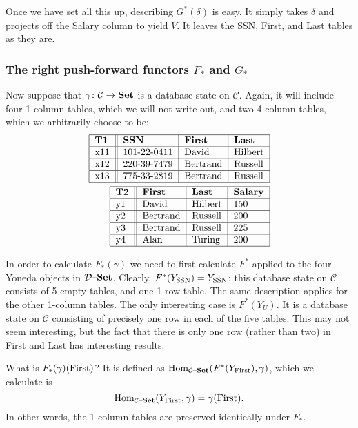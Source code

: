 \documentclass{amsart}
\def\tn{\textnormal}
\def\mc{\mathcal}
\def\Hom{\tn{Hom}}
\def\to{\rightarrow}
\def\taking{\colon}
\def\Sets{{\bf Set}}
\def\set{{\text \textendash}{\bf Set}}
\def\mcC{\mc{C}}
\def\mcD{\mc{D}}
\theoremstyle{remark}
\theoremstyle{definition}
\begin{document}
Once we have set all this up, describing $G^*(\delta)$ is easy.  It simply takes $\delta$ and projects off the Salary column to yield $V$.  It leaves the SSN, First, and Last tables as they are.

\subsubsection{The right push-forward functors $F_*$ and $G_*$}\label{sssec:rightpush}

Now suppose that $\gamma\taking\mcC\to\Sets$ is a database state on $\mcC$.  Again, it will include four 1-column tables, which we will not write out, and two 4-column tables, which we arbitrarily choose to be: \begin{align*}\begin{tabular}{| l || l | l | l |}\hline {\bf T1}&{\bf SSN}&{\bf First}&{\bf Last}\\\hline x11&101-22-0411&David&Hilbert\\\hline x12&220-39-7479&Bertrand&Russell\\\hline x13&775-33-2819&Bertrand&Russell\\\hline\end{tabular}\\\begin{tabular}{| l || l | l | l |}\hline {\bf T2}&{\bf First}&{\bf Last}&{\bf Salary}\\\hline y1&David&Hilbert&150\\\hline y2&Bertrand&Russell&200\\\hline y3&Bertrand&Russell&225\\\hline y4&Alan&Turing&200\\\hline\end{tabular}\end{align*}

In order to calculate $F_*(\gamma)$ we need to first calculate $F^*$ applied to the four Yoneda objects in $\mcD\set$.  Clearly, $F^*(Y_{\tn{SSN}})=Y_{\tn{SSN}}$; this database state on $\mcC$ consists of 5 empty tables, and one 1-row table.  The same description applies for the other 1-column tables.  The only interesting case is $F^*(Y_U)$.  It is a database state on $\mcC$ consisting of precisely one row in each of the five tables.  This may not seem interesting, but the fact that there is only one row (rather than two) in First and Last has interesting results.

What is $F_*(\gamma)(\tn{First})$?  It is defined as $\Hom_{\mcC\set}(F^*(Y_{\tn{First}}),\gamma)$, which we calculate is $$\Hom_{\mcC\set}(Y_{\tn{First}},\gamma)=\gamma(\tn{First}).$$  In other words, the 1-column tables are preserved identically under $F_*$.  
\end{document}
